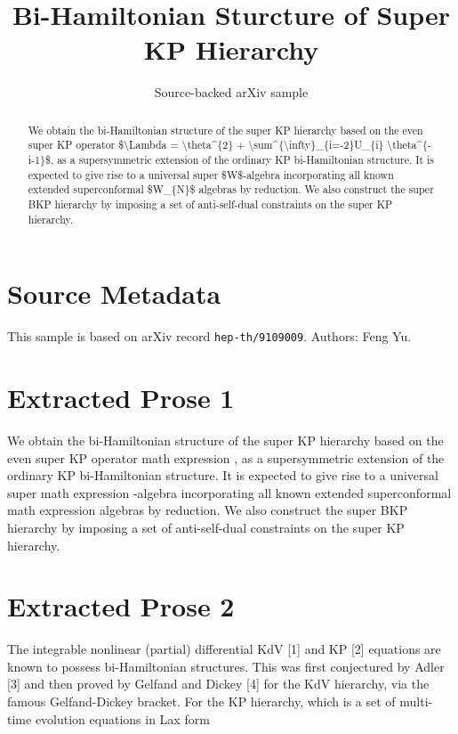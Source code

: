 \documentclass[11pt]{article}
\title{Bi-Hamiltonian Sturcture of Super KP Hierarchy}
\author{Source-backed arXiv sample}
\date{}
\begin{document}
\maketitle
\begin{abstract}
We obtain the bi-Hamiltonian structure of the super KP hierarchy based on the even super KP operator \$\textbackslash{}Lambda = \textbackslash{}theta\textasciicircum{}\{2\} + \textbackslash{}sum\textasciicircum{}\{\textbackslash{}infty\}\_\{i=-2\}U\_\{i\} \textbackslash{}theta\textasciicircum{}\{-i-1\}\$, as a supersymmetric extension of the ordinary KP bi-Hamiltonian structure. It is expected to give rise to a universal super \$W\$-algebra incorporating all known extended superconformal \$W\_\{N\}\$ algebras by reduction. We also construct the super BKP hierarchy by imposing a set of anti-self-dual constraints on the super KP hierarchy.
\end{abstract}
\section{Source Metadata}
This sample is based on arXiv record \texttt{hep-th/9109009}. Authors: Feng Yu.
\section{Extracted Prose 1}
We obtain the bi-Hamiltonian structure of the super KP hierarchy based on the even super KP operator math expression , as a supersymmetric extension of the ordinary KP bi-Hamiltonian structure. It is expected to give rise to a universal super math expression -algebra incorporating all known extended superconformal math expression algebras by reduction. We also construct the super BKP hierarchy by imposing a set of anti-self-dual constraints on the super KP hierarchy.
\section{Extracted Prose 2}
The integrable nonlinear (partial) differential KdV [1] and KP [2] equations are known to possess bi-Hamiltonian structures. This was first conjectured by Adler [3] and then proved by Gelfand and Dickey [4] for the KdV hierarchy, via the famous Gelfand-Dickey bracket. For the KP hierarchy, which is a set of multi-time evolution equations in Lax form
\end{document}
